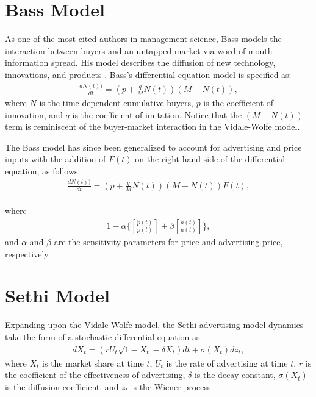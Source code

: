 \section{Bass Model}
As one of the most cited authors in management science, Bass models the interaction between buyers and an untapped market via word of mouth information spread. His model describes the diffusion of new technology, innovations, and products \cite{naik2015marketing}. Bass's differential equation model is specified as:
\begin{equation} \label{eqn:Bass1}
\left.\begin{aligned}
\frac{dN(t))}{dt}=(p+\frac{q}{M}N(t))(M-N(t)),
\end{aligned}\right.
\end{equation}
\noindent where $N$ is the time-dependent cumulative buyers, $p$ is the coefficient of innovation, and $q$ is the coefficient of imitation. Notice that the $(M-N(t))$ term is reminiscent of the buyer-market interaction in the Vidale-Wolfe model.

The Bass model has since been generalized to account for advertising and price inputs with the addition of $F(t)$ on the right-hand side of the differential equation, as follows:
\begin{equation} \label{eqn:Bass2}
\left.\begin{aligned}
\frac{dN(t))}{dt}=(p+\frac{q}{M}N(t))(M-N(t))F(t),
\end{aligned}\right.
\end{equation}\\
\noindent where
\begin{equation}
\left.\begin{aligned}
1-\alpha \{[\frac{\dot{p}(t)}{p(t)}]+\beta[\frac{\dot{a}(t)}{a(t)}]\},
\end{aligned}\right.
\end{equation}
\noindent and $\alpha$ and $\beta$ are the sensitivity parameters for price and advertising price, respectively.

\section{Sethi Model} 
Expanding upon the Vidale-Wolfe model, the Sethi advertising model dynamics take the form of a stochastic differential equation as
\begin{equation} \label{eqn:Sethi1}
\left.\begin{aligned}
dX_t=(rU_t \sqrt{1-X_t}-\delta X_t)dt + \sigma (X_t)dz_t,
\end{aligned}\right.
\end{equation}
\noindent where $X_t$ is the market share at time $t$, $U_t$ is the rate of advertising at time $t$, $r$ is the coefficient of the effectiveness of advertising, $\delta$ is the decay constant, $\sigma (X_t)$ is the diffusion coefficient, and $z_t$ is the Wiener process.

